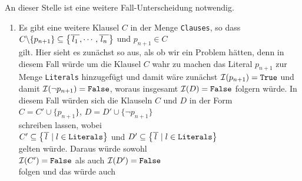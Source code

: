 \begin{enumerate}
\begin{enumerate}
                   An dieser Stelle ist eine weitere Fall-Unterscheidung notwendig.
                   \begin{enumerate}
                   \item Es gibt eine weitere Klausel $C$ in der Menge \texttt{Clauses}, so dass
                         \\[0.2cm]
                         \hspace*{1.3cm}
                         $C \backslash \{ p_{n+1} \} \subseteq \bigl\{ \overline{\,l_1\,}, \cdots,
                         \overline{\,l_n\,} \bigr\}$ \quad und \quad $p_{n+1} \in C$
                         \\[0.2cm]
                         gilt.  Hier sieht es zunächst so aus, als ob wir ein Problem hätten, denn
                         in diesem Fall würde um die Klausel $C$ wahr zu machen das Literal $p_{n+1}$ zur Menge
                         \texttt{Literals} hinzugefügt und damit wäre zunächst $\mathcal{I}(p_{n+1}) = \texttt{True}$ 
                         und damit $\mathcal{I}(\neg p_{n+1}) = \texttt{False}$, woraus insgesamt 
                         $\mathcal{I}(D) = \texttt{False}$ folgern würde.  In diesem Fall würden sich
                         die Klauseln $C$ und $D$  in der Form
                         \\[0.2cm]
                         \hspace*{1.3cm}
                         $C = C' \cup \{p_{n+1}\}$, \quad $D = D' \cup \{ \neg p_{n+1} \}$
                         \\[0.2cm]
                         schreiben lassen, wobei 
                         \\[0.2cm]
                         \hspace*{1.3cm}
                         $C' \subseteq \bigl\{ \overline{\,l\,} \mid l \in \texttt{Literals} \bigr\}$  \quad und \quad
                         $D' \subseteq \bigl\{ \overline{\,l\,} \mid l \in \texttt{Literals} \bigr\}$
                         \\[0.2cm]
                         gelten würde.  Daraus würde sowohl
                         \\[0.2cm]
                         \hspace*{1.3cm}
                         $\mathcal{I}(C') = \texttt{False}$ \quad als auch \quad $\mathcal{I}(D') = \texttt{False}$
                         \\[0.2cm]
                         folgen und das würde auch
                         \\[0.2cm]

\end{enumerate}
\end{enumerate}
\end{enumerate}
